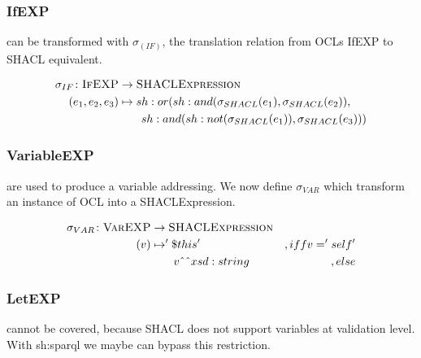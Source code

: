 \documentclass[runningheads]{llncs}
\begin{document}
\subsubsection{IfEXP}
can be transformed with \(\sigma_(IF)\), the translation relation from OCLs IfEXP to SHACL equivalent.
\begin{definition}
    \begin{align*}
        \sigma_{IF}\colon\textsc{IfEXP} & \to\textsc{SHACLExpression}                                     \\
        (e_1, e_2, e_3)                 & \mapsto sh:or(sh:and(\sigma_{SHACL}(e_1),\sigma_{SHACL}(e_2)),  \\
                                        & \qquad sh:and(sh:not(\sigma_{SHACL}(e_1)),\sigma_{SHACL}(e_3))) \\
    \end{align*}
\end{definition}
\subsubsection{VariableEXP}
are used to produce a variable addressing.
We now define \(\sigma_{VAR}\) which transform an instance of OCL into a SHACLExpression.
\begin{definition}
    \begin{align*}
        \sigma_{VAR}\colon\textsc{VarEXP} & \to\textsc{SHACLExpression}                         \\
        (v)                               & \mapsto'\$this'                     & ,iff v='self' \\
                                          & \qquad v\string^\string^ xsd:string & ,else
    \end{align*}
\end{definition}
\subsubsection{LetEXP}
cannot be covered, because SHACL does not support variables at validation level.
With sh:sparql we maybe can bypass this restriction.
\end{document}
